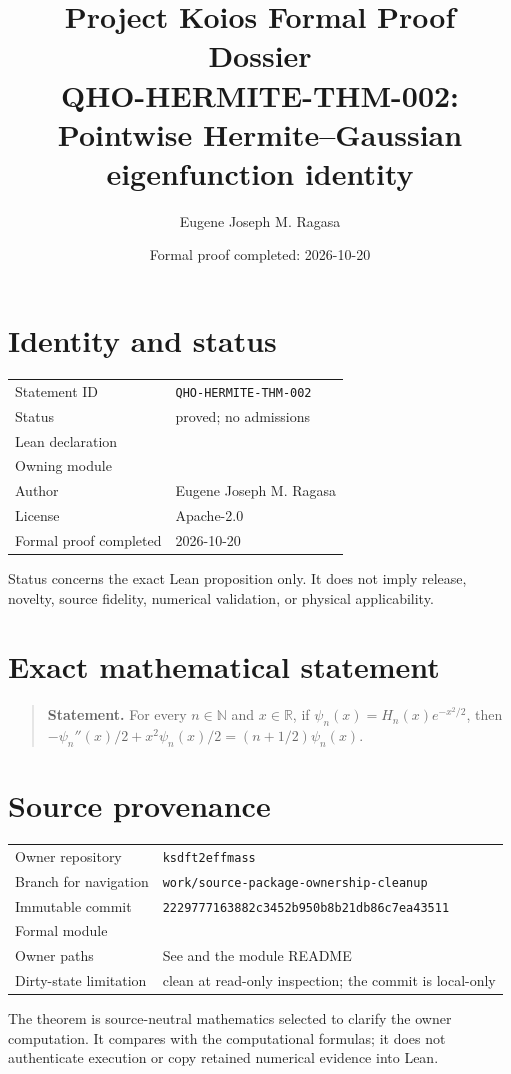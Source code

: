 \documentclass[11pt]{article}
\title{Project Koios Formal Proof Dossier\\\large QHO-HERMITE-THM-002: Pointwise Hermite--Gaussian eigenfunction identity}
\author{Eugene Joseph M. Ragasa}
\date{Formal proof completed: 2026-10-20}
\begin{document}
\maketitle

\section{Identity and status}
\begin{tabularx}{\textwidth}{@{}lY@{}}\toprule
Statement ID & \texttt{QHO-HERMITE-THM-002} \\
Status & proved; no admissions \\
Lean declaration &  \\
Owning module &  \\
Author & Eugene Joseph M. Ragasa \\
License & Apache-2.0 \\
Formal proof completed & 2026-10-20 \\
\bottomrule\end{tabularx}
Status concerns the exact Lean proposition only. It does not imply release, novelty,
source fidelity, numerical validation, or physical applicability.

\section{Exact mathematical statement}
\begin{quote}\textbf{Statement.} For every $n\in\mathbb N$ and $x\in\mathbb R$, if $\psi_n(x)=H_n(x)e^{-x^2/2}$, then $-\psi_n''(x)/2+x^2\psi_n(x)/2=(n+1/2)\psi_n(x)$.\end{quote}

\section{Source provenance}
\begin{tabularx}{\textwidth}{@{}lY@{}}\toprule
Owner repository & \texttt{ksdft2effmass} \\
Branch for navigation & \texttt{work/source-package-ownership-cleanup} \\
Immutable commit & \texttt{2229777163882c3452b950b8b21db86c7ea43511} \\
Formal module &  \\
Owner paths & See  and the module README \\
Dirty-state limitation & clean at read-only inspection; the commit is local-only \\
\bottomrule\end{tabularx}
The theorem is source-neutral mathematics selected to clarify the owner computation. It
compares with the computational formulas; it does not authenticate execution or copy
retained numerical evidence into Lean.
\end{document}
